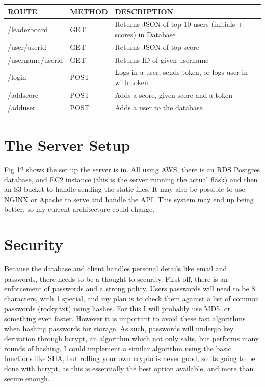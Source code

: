 \documentclass[a4paper, 11pt]{report}
\begin{document}
\begin{table}[h!]
\begin{tabular}{|l|l|l|}
\hline
\rowcolor[HTML]{C0C0C0} 
ROUTE            & METHOD & DESCRIPTION                                                  \\ \hline
/leaderboard     & GET    & Returns JSON of top 10 users (initials + scores) in Database \\ \hline
/user/userid     & GET    & Returns JSON of top score                                    \\ \hline
/username/userid & GET    & Returns ID of given username                                 \\ \hline
/login           & POST   & Logs in a user, sends token, or logs user in with token      \\ \hline
/addscore        & POST   & Adds a score, given score and a token                        \\ \hline
/adduser         & POST   & Adds a user to the database                                  \\ \hline
\end{tabular}
\end{table}


\section{The Server Setup}
Fig 12 shows the set up the server is in. All using AWS, there is an RDS Postgres database, and EC2 instance (this is the server running the actual flask) and then an S3 bucket to handle sending the static files. It may also be possible to use NGINX or Apache to serve and handle the API. This system may end up being better, so my current architecture could change. 

\section{Security}
Because the database and client handles personal details like email and passwords, there needs to be a thought to security. First off, there is an enforcement of passwords and a strong policy. Users passwords will need to be 8 characters, with 1 special, and my plan is to check them against a list of common passwords (rocky.txt) using hashes. For this I will probably use MD5, or something even faster. However it is important to avoid these fast algorithms when hashing passwords for storage. As such, passwords will undergo key derivation through bcrypt, an algorithm which not only salts, but performs many rounds of hashing. I could implement a similar algorithm using the basic functions like SHA, but rolling your own crypto is never good, so its going to be done with bcrypt, as this is essentially the best option available, and more than secure enough.
\end{document}
